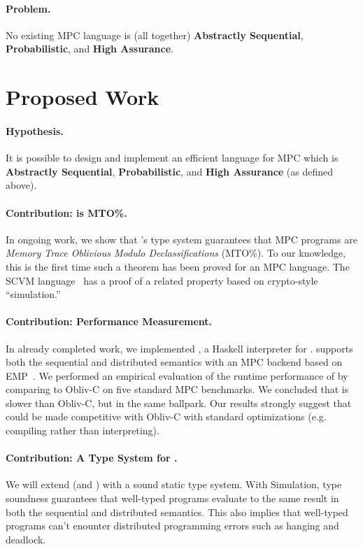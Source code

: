 \paragraph{Problem.} No existing MPC language is (all together) \textbf{Abstractly Sequential}, \textbf{Probabilistic}, and \textbf{High Assurance}.

\section{Proposed Work}
\label{sec:intro-proposal}

\paragraph{Hypothesis.} It is possible to design and implement an efficient language for MPC which is \textbf{Abstractly Sequential},
\textbf{Probabilistic}, and \textbf{High Assurance} (as defined above).

\paragraph{Contribution: \mpc is MTO\%.} In ongoing work, we show that \mpc's type system guarantees that MPC programs are
\emph{Memory Trace Oblivious Modulo Declassifications} (MTO\%). To our knowledge, this is the first time such a theorem has been
proved for an MPC language. The SCVM language~\cite{liu14scram} has a proof of a related property based on crypto-style ``simulation.''

\paragraph{Contribution: \mpc Performance Measurement.} In already completed work, we implemented \system, a Haskell
interpreter for \mpc. \system supports both the sequential and distributed semantics with an MPC backend based on EMP~\cite{emp-toolkit}.
We performed an empirical evaluation of the runtime performance of \system by comparing to Obliv-C on five standard MPC benchmarks. We concluded
that \system is slower than Obliv-C, but in the same ballpark. Our results strongly suggest that \system could be made competitive with Obliv-C
with standard optimizations (e.g. compiling rather than interpreting).

\paragraph{Contribution: A Type System for \mpc.} We will extend \mpc (and \system) with a sound static type system. With Simulation,
type soundness guarantees that well-typed programs evaluate to the same result in both the sequential and distributed semantics.
This also implies that well-typed programs can't enounter distributed programming errors such as hanging and deadlock.

